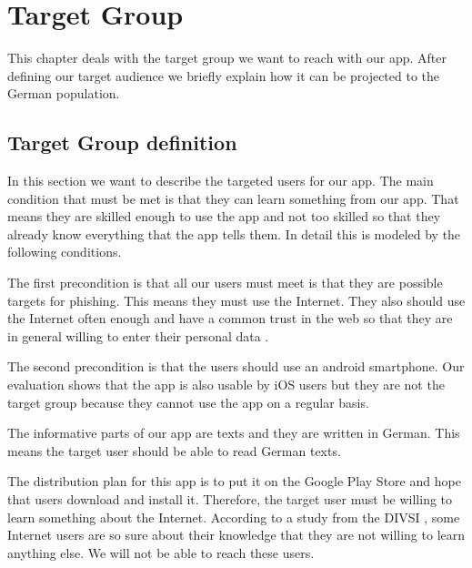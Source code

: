 \section{Target Group}
\label{s:target_group}
This chapter deals with the target group we want to reach with our app.
After defining our target audience we briefly explain how it can be projected to the German population.

\subsection{Target Group definition}
In this section we want to describe the targeted users for our app.
The main condition that must be met is that they can learn something from our app.
That means they are skilled enough to use the app and not too skilled so that they already know everything that the app tells them.
In detail this is modeled by the following conditions.
\begin{description}[leftmargin=0cm]
\item[Attackability] The first precondition is that all our users must meet is that they are possible targets for phishing.
This means they must use the Internet.
They also should use the Internet often enough and have a common trust in the web so that they are in general willing to enter their personal data \cite{divsi2012divsi}.

\item[Android Users] The second precondition is that the users should use an android smartphone.
Our evaluation shows that the app is also usable by iOS users but they are not the target group because they cannot use the app on a regular basis.
\item[Language] The informative parts of our app are texts and they are written in German.
This means the target user should be able to read German texts.
\item[Motivation] The distribution plan for this app is to put it on the Google Play Store and hope that users download and install it.
Therefore, the target user must be willing to learn something about the Internet. According to a study from the DIVSI \cite{divsi2012divsi}, some Internet users are so sure about their knowledge that they are not willing to learn anything else.
We will not be able to reach these users.
\end{description}

